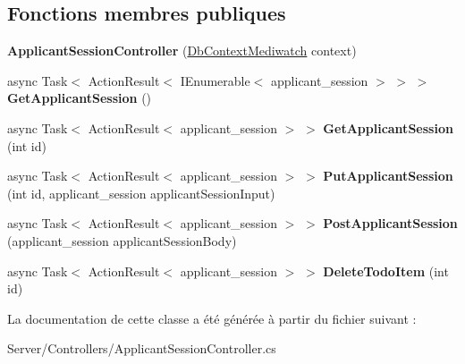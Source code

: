\subsection*{Fonctions membres publiques}
\begin{DoxyCompactItemize}
\item 
\mbox{\label{class_mediwatch_1_1_server_1_1_controllers_1_1_applicant_session_controller_a25bd4d18e93861e4d99e672b127db48b}} 
{\bfseries Applicant\+Session\+Controller} (\hyperlink{class_server_1_1_db_context_mediwatch}{Db\+Context\+Mediwatch} context)
\item 
\mbox{\label{class_mediwatch_1_1_server_1_1_controllers_1_1_applicant_session_controller_adf8d12f5dcaaa4395522c8febae1e735}} 
async Task$<$ Action\+Result$<$ I\+Enumerable$<$ applicant\+\_\+session $>$ $>$ $>$ {\bfseries Get\+Applicant\+Session} ()
\item 
\mbox{\label{class_mediwatch_1_1_server_1_1_controllers_1_1_applicant_session_controller_ada65188cced0326a54f824a251869f02}} 
async Task$<$ Action\+Result$<$ applicant\+\_\+session $>$ $>$ {\bfseries Get\+Applicant\+Session} (int id)
\item 
\mbox{\label{class_mediwatch_1_1_server_1_1_controllers_1_1_applicant_session_controller_a9b9428a2f0209f15ef65b1262e220234}} 
async Task$<$ Action\+Result$<$ applicant\+\_\+session $>$ $>$ {\bfseries Put\+Applicant\+Session} (int id, applicant\+\_\+session applicant\+Session\+Input)
\item 
\mbox{\label{class_mediwatch_1_1_server_1_1_controllers_1_1_applicant_session_controller_a58d68c490175d8d0a13aa0104a36aed8}} 
async Task$<$ Action\+Result$<$ applicant\+\_\+session $>$ $>$ {\bfseries Post\+Applicant\+Session} (applicant\+\_\+session applicant\+Session\+Body)
\item 
\mbox{\label{class_mediwatch_1_1_server_1_1_controllers_1_1_applicant_session_controller_af3f0c4921fadd1483d25e39df7d5a857}} 
async Task$<$ Action\+Result$<$ applicant\+\_\+session $>$ $>$ {\bfseries Delete\+Todo\+Item} (int id)
\end{DoxyCompactItemize}


La documentation de cette classe a été générée à partir du fichier suivant \+:\begin{DoxyCompactItemize}
\item 
Server/\+Controllers/Applicant\+Session\+Controller.\+cs\end{DoxyCompactItemize}
